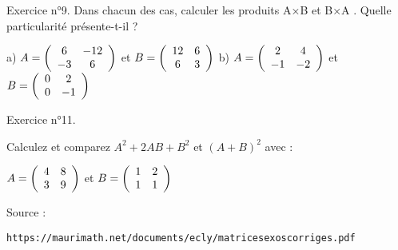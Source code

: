 \vspace{.323cm}
Exercice n°9.
Dans chacun des cas, calculer les produits A×B et B×A . Quelle particularité présente-t-il ?

a)
$ A = 
\left( \begin{array}{ c c }
 6 & -12 \\ -3 & 6
\end{array} \right)$
et
$ B = 
\left( \begin{array}{ c c }
 12 & 6 \\ 6 & 3
\end{array} \right)$
b)
$ A = 
\left( \begin{array}{ c c }
 2 & 4 \\ -1 & -2
\end{array} \right)$
et
$ B = 
\left( \begin{array}{ c c }
 0 & 2 \\ 0 & -1
\end{array} \right)$

\vspace{.323cm}
Exercice n°11.

Calculez et comparez $A^2 + 2 AB + B^2$ et $( A + B )^2$ avec : 
\begin{center}
$ A = 
\left( \begin{array}{ c c }
4 & 8 \\ 3 & 9
\end{array} \right)$
et
$ B =
\left( \begin{array}{ c c }
1 & 2 \\ 1 & 1
\end{array} \right)$
\end{center}

\vspace{.323cm}
{\scriptsize Source : 

\texttt{https://maurimath.net/documents/ecly/matricesexoscorriges.pdf}}

